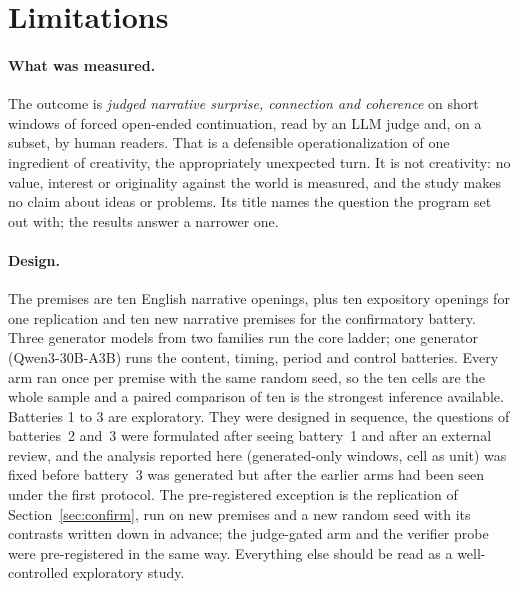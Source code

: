 \section{Limitations}
\label{sec:limitations}

\paragraph{What was measured.} The outcome is \emph{judged narrative
surprise, connection and coherence} on short windows of forced open-ended
continuation, read by an LLM judge and, on a subset, by human readers. That
is a defensible operationalization of one ingredient of creativity, the
appropriately unexpected turn. It is not creativity: no value, interest or
originality against the world is measured, and the study makes no claim
about ideas or problems. Its title names the question the program set out
with; the results answer a narrower one.

\paragraph{Design.} The premises are ten English narrative openings, plus
ten expository openings for one replication and ten new narrative premises
for the confirmatory battery. Three generator models from two families run
the core ladder; one generator (Qwen3-30B-A3B) runs the content, timing,
period and control batteries. Every arm ran once per premise with the same
random seed, so the ten cells are the whole sample and a paired comparison
of ten is the strongest inference available. Batteries 1 to 3 are
exploratory. They were designed in sequence, the questions of batteries~2
and~3 were formulated after seeing battery~1 and after an external review,
and the analysis reported here (generated-only windows, cell as unit) was
fixed before battery~3 was generated but after the earlier arms had been
seen under the first protocol. The pre-registered exception is the
replication of Section~\ref{sec:confirm}, run on new premises and a new
random seed with its contrasts written down in advance; the judge-gated arm
and the verifier probe were pre-registered in the same way. Everything else
should be read as a well-controlled exploratory study.

